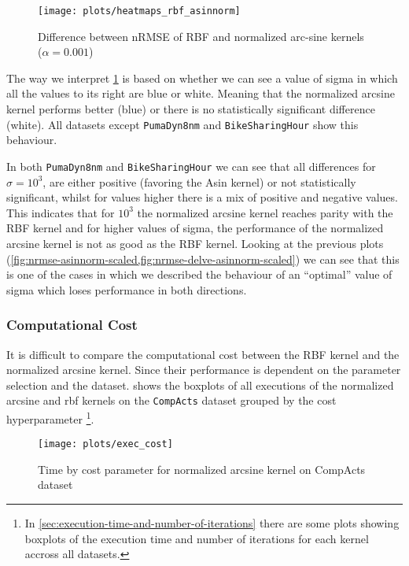 \begin{figure}[H]
    \texttt{[image: plots/heatmaps\_rbf\_asinnorm]}
    \caption{Difference between nRMSE of RBF and normalized arc-sine kernels ($\alpha=0.001$)}
    \label{fig:paired-ttest-rbf-asinnorm-diff}
\end{figure}

The way we interpret \cref{fig:paired-ttest-rbf-asinnorm-diff} is based on whether
we can see a value of sigma in which all the values to its right are blue or white.
Meaning that the normalized arcsine kernel performs better (blue) or there is no
statistically significant difference (white). All datasets except
\texttt{PumaDyn8nm} and \texttt{BikeSharingHour} show this behaviour.

In both \texttt{PumaDyn8nm} and \texttt{BikeSharingHour} we can see that all
differences for $\sigma=10^3$, are either positive (favoring the Asin kernel) or
not statistically significant, whilst for values higher there is a mix of positive
and negative values. This indicates that for $10^3$ the normalized arcsine kernel
reaches parity with the RBF kernel and for higher values of sigma, the performance
of the normalized arcsine kernel is not as good as the RBF kernel. Looking
at the previous plots (\cref{fig:nrmse-asinnorm-scaled,fig:nrmse-delve-asinnorm-scaled})
we can see that this is one of the cases in which we described the behaviour of
an ``optimal'' value of sigma which loses performance in both directions.

\subsubsection{Computational Cost}
\label{ssub:computational_cost}

It is difficult to compare the computational cost between the RBF kernel
and the normalized arcsine kernel. Since their performance is dependent
on the parameter selection and the dataset. 
shows the boxplots of all executions of the normalized arcsine and rbf kernels
on the \texttt{CompActs} dataset grouped by the cost hyperparameter%
\footnote{In \cref{sec:execution-time-and-number-of-iterations} there are some plots showing
    boxplots of the execution time and number of iterations for each kernel accross
    all datasets.}.

\begin{figure}[H]
    \texttt{[image: plots/exec\_cost]}
    \caption{Time by cost parameter for normalized arcsine kernel on CompActs dataset}
    \label{fig:time-asinnorm-scaled-compacts}
\end{figure}

